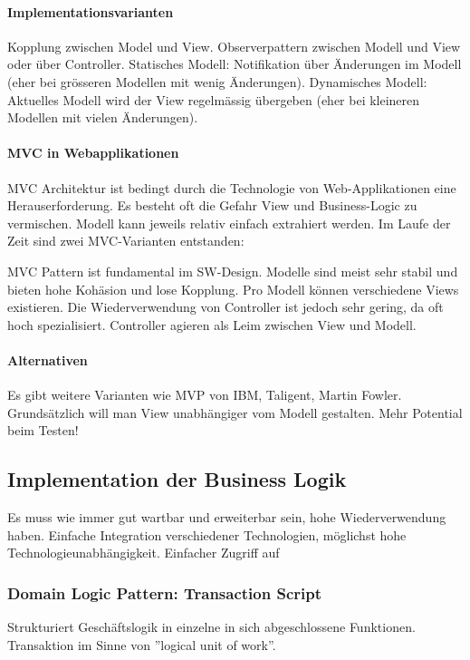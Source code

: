 \paragraph{Implementationsvarianten} Kopplung zwischen Model und View. Observerpattern zwischen Modell und View oder über Controller. Statisches Modell: Notifikation über Änderungen im Modell (eher bei grösseren Modellen mit wenig Änderungen). Dynamisches Modell: Aktuelles Modell wird der View regelmässig übergeben (eher bei kleineren Modellen mit vielen Änderungen).

\paragraph{MVC in Webapplikationen} 
MVC Architektur ist bedingt durch die Technologie von Web-Applikationen eine Herauserforderung. Es besteht oft die Gefahr View und Business-Logic zu vermischen. Modell kann jeweils relativ einfach extrahiert werden. Im Laufe der Zeit sind zwei MVC-Varianten entstanden:

MVC Pattern ist fundamental im SW-Design. Modelle sind meist sehr stabil und bieten hohe Kohäsion und lose Kopplung. Pro Modell können verschiedene Views existieren. Die Wiederverwendung von Controller ist jedoch sehr gering, da oft hoch spezialisiert. Controller agieren als Leim zwischen View und Modell.

\paragraph{Alternativen} Es gibt weitere Varianten wie MVP von IBM, Taligent, Martin Fowler. Grundsätzlich will man View unabhängiger vom Modell gestalten. Mehr Potential beim Testen!

\subsection{Implementation der Business Logik}
Es muss wie immer gut wartbar und erweiterbar sein, hohe Wiederverwendung haben. Einfache Integration verschiedener Technologien, möglichst hohe Technologieunabhängigkeit. Einfacher Zugriff auf 

\subsubsection{Domain Logic Pattern: Transaction Script}
Strukturiert Geschäftslogik in einzelne in sich abgeschlossene Funktionen. Transaktion im Sinne von ''logical unit of work''.

